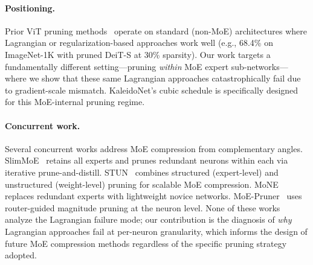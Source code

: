 \paragraph{Positioning.}
Prior ViT pruning methods~\citep{chen2021chasing,yu2022width} operate on standard (non-MoE) architectures where Lagrangian or regularization-based approaches work well (e.g., 68.4\% on ImageNet-1K with pruned DeiT-S at 30\% sparsity). Our work targets a fundamentally different setting---pruning \emph{within} MoE expert sub-networks---where we show that these same Lagrangian approaches catastrophically fail due to gradient-scale mismatch. KaleidoNet's cubic schedule is specifically designed for this MoE-internal pruning regime.

\paragraph{Concurrent work.}
Several concurrent works address MoE compression from complementary angles. SlimMoE~\citep{slimmoe2025} retains all experts and prunes redundant neurons within each via iterative prune-and-distill. STUN~\citep{stun2025} combines structured (expert-level) and unstructured (weight-level) pruning for scalable MoE compression. MoNE~\citep{mone2025} replaces redundant experts with lightweight novice networks. MoE-Pruner~\citep{moepruner2025} uses router-guided magnitude pruning at the neuron level. None of these works analyze the Lagrangian failure mode; our contribution is the diagnosis of \emph{why} Lagrangian approaches fail at per-neuron granularity, which informs the design of future MoE compression methods regardless of the specific pruning strategy adopted.
